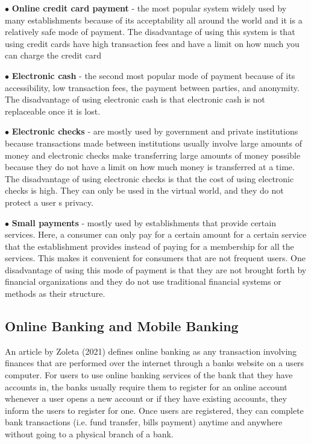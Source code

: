 \begin{description}
   \item $\bullet$ \textbf{Online credit card payment} - the most popular system widely used by many establishments because of its acceptability all around the world and it is a relatively safe mode of payment. The disadvantage of using this system is that using credit cards have high transaction fees and have a limit on how much you can charge the credit card
   \item $\bullet$ \textbf{Electronic cash} - the second most popular mode of payment because of its accessibility, low transaction fees, the payment between parties, and anonymity. The disadvantage of using electronic cash is that electronic cash is not replaceable once it is lost.
   \item $\bullet$ \textbf{Electronic checks} - are mostly used by government and private institutions because transactions made between institutions usually involve large amounts of money and electronic checks make transferring large amounts of money possible because they do not have a limit on how much money is transferred at a time. The disadvantage of using electronic checks is that the cost of using electronic checks is high. They can only be used in the virtual world, and they do not protect a user \textsc{}s privacy.
   \item $\bullet$ \textbf{Small payments} - mostly used by establishments that provide certain services. Here, a consumer can only pay for a certain amount for a certain service that the establishment provides instead of paying for a membership for all the services. This makes it convenient for consumers that are not frequent users. One disadvantage of using this mode of payment is that they are not brought forth by financial organizations and they do not use traditional financial systems or methods as their structure. 
\end{description}

\subsection{Online Banking and Mobile Banking}
An article by Zoleta (2021) defines online banking as any transaction involving finances that are performed over the internet through a bank\textsc{}s website on a user\textsc{}s computer. For users to use online banking services of the bank that they have accounts in, the banks usually require them to register for an online account whenever a user opens a new account or if they have existing accounts, they inform the users to register for one. Once users are registered, they can complete bank transactions (i.e. fund transfer, bills payment) anytime and anywhere without going to a physical branch of a bank.
	
